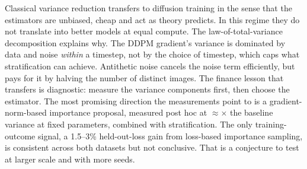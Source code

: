 Classical variance reduction transfers to diffusion training in the sense that the estimators are unbiased,
cheap and act as theory predicts. In this regime they do not translate into better models at equal compute.
The law-of-total-variance decomposition explains why. The DDPM gradient's variance is dominated by data and
noise \emph{within} a timestep, not by the choice of timestep, which caps what stratification can achieve. Antithetic
noise cancels the noise term efficiently, but pays for it by halving the number of distinct images. The finance
lesson that transfers is diagnostic: measure the variance components first, then choose the estimator. The
most promising direction the measurements point to is a gradient-norm-based importance proposal, measured
post hoc at $\approx$\PHOracle$\times$ the baseline variance at fixed parameters, combined with stratification.
The only training-outcome signal, a 1.5--3\% held-out-loss gain from loss-based importance sampling, is
consistent across both datasets but not conclusive. That is a conjecture to test at larger
scale and with more seeds.
